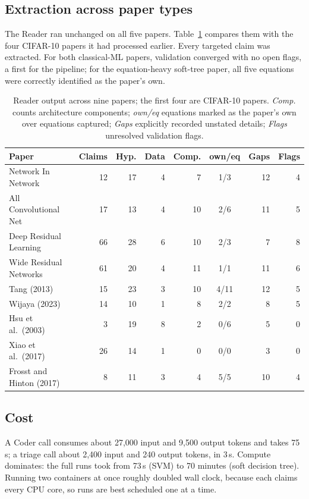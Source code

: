 \documentclass[11pt]{article}
\begin{document}
\subsection{Extraction across paper types}

The Reader ran unchanged on all five papers. Table~\ref{tab:reader} compares them with the four
CIFAR-10 papers it had processed earlier. Every targeted claim was extracted. For both
classical-ML papers, validation converged with no open flags, a first for the pipeline; for the
equation-heavy soft-tree paper, all five equations were correctly identified as the paper's
own.

\begin{table}[tbp]
\centering
\small
\caption{Reader output across nine papers; the first four are CIFAR-10 papers. \emph{Comp.}
counts architecture components; \emph{own/eq} equations marked as the paper's own over
equations captured; \emph{Gaps} explicitly recorded unstated details; \emph{Flags} unresolved
validation flags.}
\label{tab:reader}
\begin{tabular}{lrrrrcrr}
\toprule
Paper & Claims & Hyp. & Data & Comp. & own/eq & Gaps & Flags \\
\midrule
Network In Network      & 12 & 17 & 4 &  7 & 1/3  & 12 & 4 \\
All Convolutional Net   & 17 & 13 & 4 & 10 & 2/6  & 11 & 5 \\
Deep Residual Learning  & 66 & 28 & 6 & 10 & 2/3  &  7 & 8 \\
Wide Residual Networks  & 61 & 20 & 4 & 11 & 1/1  & 11 & 6 \\
\midrule
Tang (2013)                  & 15 & 23 & 3 & 10 & 4/11 & 12 & 5 \\
Wijaya (2023)                & 14 & 10 & 1 &  8 & 2/2  &  8 & 5 \\
Hsu et al.\ (2003)           &  3 & 19 & 8 &  2 & 0/6  &  5 & 0 \\
Xiao et al.\ (2017)          & 26 & 14 & 1 &  0 & 0/0  &  3 & 0 \\
Frosst and Hinton (2017)     &  8 & 11 & 3 &  4 & 5/5  & 10 & 4 \\
\bottomrule
\end{tabular}
\end{table}

\subsection{Cost}

A Coder call consumes about 27{,}000 input and 9{,}500 output tokens and takes 75\,s; a triage
call about 2{,}400 input and 240 output tokens, in 3\,s. Compute dominates: the full runs took
from 73\,s (SVM) to 70 minutes (soft decision tree). Running two containers at once roughly doubled wall
clock, because each claims every CPU core, so runs are best scheduled one at a time.
\end{document}
